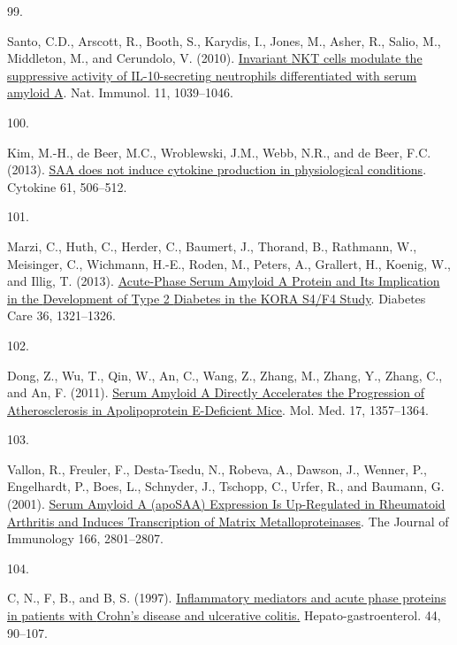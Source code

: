 \documentclass[
]{article}
\newlength{\cslhangindent}
\newlength{\csllabelwidth}
\newlength{\cslentryspacingunit} %
\newenvironment{CSLReferences}[2] %
 {%
  \setlength{\parindent}{0pt}
  \ifodd #1
  \let\oldpar\par
  \def\par{\hangindent=\cslhangindent\oldpar}
  \fi
  \setlength{\parskip}{#2\cslentryspacingunit}
 }%
 {}
\newcommand{\CSLLeftMargin}[1]{\parbox[t]{\csllabelwidth}{#1}}
\newcommand{\CSLRightInline}[1]{\parbox[t]{\linewidth - \csllabelwidth}{#1}\break}
\begin{document}
\begin{CSLReferences}{0}{0}
\leavevmode{}%
\CSLLeftMargin{99. }
\CSLRightInline{Santo, C.D., Arscott, R., Booth, S., Karydis, I., Jones, M., Asher, R., Salio, M., Middleton, M., and Cerundolo, V. (2010). \href{https://doi.org/10.1038/ni.1942}{Invariant {NKT} cells modulate the suppressive activity of {IL-10-secreting} neutrophils differentiated with serum amyloid {A}}. Nat. Immunol. 11, 1039--1046.}

\leavevmode{}%
\CSLLeftMargin{100. }
\CSLRightInline{Kim, M.-H., de Beer, M.C., Wroblewski, J.M., Webb, N.R., and de Beer, F.C. (2013). \href{https://doi.org/10.1016/j.cyto.2012.10.019}{{SAA} does not induce cytokine production in physiological conditions}. Cytokine 61, 506--512.}

\leavevmode{}%
\CSLLeftMargin{101. }
\CSLRightInline{Marzi, C., Huth, C., Herder, C., Baumert, J., Thorand, B., Rathmann, W., Meisinger, C., Wichmann, H.-E., Roden, M., Peters, A., Grallert, H., Koenig, W., and Illig, T. (2013). \href{https://doi.org/10.2337/dc12-1514}{Acute-{Phase Serum Amyloid A Protein} and {Its Implication} in the {Development} of {Type} 2 {Diabetes} in the {KORA S4}/{F4 Study}}. Diabetes Care 36, 1321--1326.}

\leavevmode{}%
\CSLLeftMargin{102. }
\CSLRightInline{Dong, Z., Wu, T., Qin, W., An, C., Wang, Z., Zhang, M., Zhang, Y., Zhang, C., and An, F. (2011). \href{https://doi.org/10.2119/molmed.2011.00186}{Serum {Amyloid A Directly Accelerates} the {Progression} of {Atherosclerosis} in {Apolipoprotein E-Deficient Mice}}. Mol. Med. 17, 1357--1364.}

\leavevmode{}%
\CSLLeftMargin{103. }
\CSLRightInline{Vallon, R., Freuler, F., Desta-Tsedu, N., Robeva, A., Dawson, J., Wenner, P., Engelhardt, P., Boes, L., Schnyder, J., Tschopp, C., Urfer, R., and Baumann, G. (2001). \href{https://doi.org/10.4049/jimmunol.166.4.2801}{Serum {Amyloid A} ({apoSAA}) {Expression Is Up-Regulated} in {Rheumatoid Arthritis} and {Induces Transcription} of {Matrix Metalloproteinases}}. The Journal of Immunology 166, 2801--2807.}

\leavevmode{}%
\CSLLeftMargin{104. }
\CSLRightInline{C, N., F, B., and B, S. (1997). \href{https://www.ncbi.nlm.nih.gov/pubmed/9058126}{Inflammatory mediators and acute phase proteins in patients with {Crohn}'s disease and ulcerative colitis.} Hepato-gastroenterol. 44, 90--107.}


\end{CSLReferences}
\end{document}
